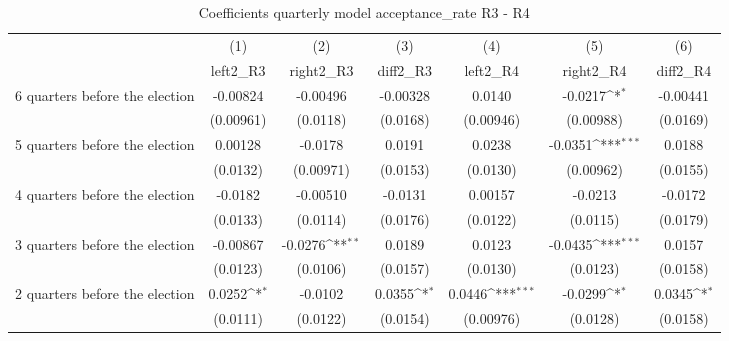 \begin{table}[htbp]\centering
\def\sym#1{\ifmmode^{#1}\else\(^{#1}\)\fi}
\caption{Coefficients quarterly model acceptance\_rate R3 - R4}
\begin{tabular}{l*{6}{c}}
\hline\hline
                    &\multicolumn{1}{c}{(1)}&\multicolumn{1}{c}{(2)}&\multicolumn{1}{c}{(3)}&\multicolumn{1}{c}{(4)}&\multicolumn{1}{c}{(5)}&\multicolumn{1}{c}{(6)}\\
                    &\multicolumn{1}{c}{left2\_R3}&\multicolumn{1}{c}{right2\_R3}&\multicolumn{1}{c}{diff2\_R3}&\multicolumn{1}{c}{left2\_R4}&\multicolumn{1}{c}{right2\_R4}&\multicolumn{1}{c}{diff2\_R4}\\
\hline
 6 quarters before the election&    -0.00824         &    -0.00496         &    -0.00328         &      0.0140         &     -0.0217\sym{*}  &    -0.00441         \\
                    &   (0.00961)         &    (0.0118)         &    (0.0168)         &   (0.00946)         &   (0.00988)         &    (0.0169)         \\
[1em]
 5 quarters before the election&     0.00128         &     -0.0178         &      0.0191         &      0.0238         &     -0.0351\sym{***}&      0.0188         \\
                    &    (0.0132)         &   (0.00971)         &    (0.0153)         &    (0.0130)         &   (0.00962)         &    (0.0155)         \\
[1em]
 4 quarters before the election&     -0.0182         &    -0.00510         &     -0.0131         &     0.00157         &     -0.0213         &     -0.0172         \\
                    &    (0.0133)         &    (0.0114)         &    (0.0176)         &    (0.0122)         &    (0.0115)         &    (0.0179)         \\
[1em]
 3 quarters before the election&    -0.00867         &     -0.0276\sym{**} &      0.0189         &      0.0123         &     -0.0435\sym{***}&      0.0157         \\
                    &    (0.0123)         &    (0.0106)         &    (0.0157)         &    (0.0130)         &    (0.0123)         &    (0.0158)         \\
[1em]
 2 quarters before the election&      0.0252\sym{*}  &     -0.0102         &      0.0355\sym{*}  &      0.0446\sym{***}&     -0.0299\sym{*}  &      0.0345\sym{*}  \\
                    &    (0.0111)         &    (0.0122)         &    (0.0154)         &   (0.00976)         &    (0.0128)         &    (0.0158)         \\

\end{tabular}
\end{table}
